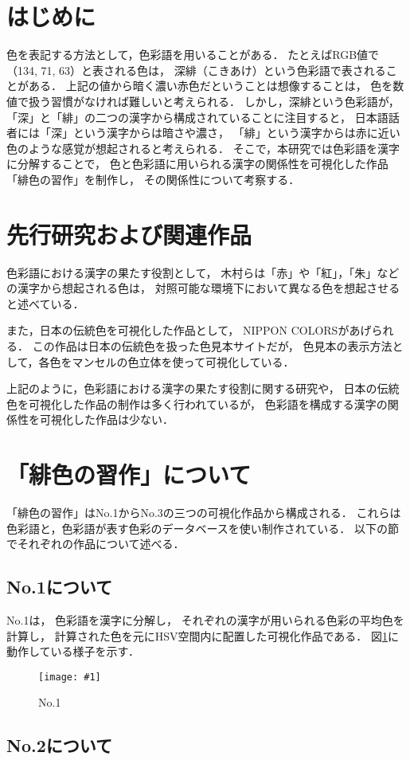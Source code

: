 \documentclass[a4j,twocolumn]{ujarticle} %
\newcommand{\workname}{緋色の習作}
\newcommand{\colorname}{色彩語}
\newcommand{\mysection}[1]{\vspace{-20pt}\section{#1}}
\newcommand{\mysubsection}[1]{\vspace{-18pt}\subsection{#1}}
\newcommand{\myfigure}[3]{
\begin{figure}[htbp]
  \begin{center}
    \texttt{[image: \#1]}
    \caption{#2}
    \vspace{-2zh}
    \label{#3}
  \end{center}
\end{figure}
}
\begin{document}
\maketitle
\thispagestyle{myheadings}

\mysection{はじめに}

色を表記する方法として，\colorname{}を用いることがある．
たとえばRGB値で（134, 71, 63）と表される色は，
深緋（こきあけ）という\colorname{}で表されることがある．
上記の値から暗く濃い赤色だということは想像することは，
色を数値で扱う習慣がなければ難しいと考えられる．
しかし，深緋という\colorname{}が，
「深」と「緋」の二つの漢字から構成されていることに注目すると，
日本語話者には「深」という漢字からは暗さや濃さ，
「緋」という漢字からは赤に近い色のような感覚が想起されると考えられる．
そこで，本研究では\colorname{}を漢字に分解することで，
色と\colorname{}に用いられる漢字の関係性を可視化した作品「\workname{}」を制作し，
その関係性について考察する．

\mysection{先行研究および関連作品}

色彩語における漢字の果たす役割として，
木村ら\cite{Kimura1998}は「赤」や「紅」，「朱」などの漢字から想起される色は，
対照可能な環境下において異なる色を想起させると述べている．

また，日本の伝統色を可視化した作品として，
NIPPON COLORS\cite{NipponColors}があげられる．
この作品は日本の伝統色を扱った色見本サイトだが，
色見本の表示方法として，各色をマンセルの色立体を使って可視化している．

上記のように，色彩語における漢字の果たす役割に関する研究や，
日本の伝統色を可視化した作品の制作は多く行われているが，
色彩語を構成する漢字の関係性を可視化した作品は少ない．

\section{「\workname{}」について}

「\workname{}」はNo.1からNo.3の三つの可視化作品から構成される．
これらは\colorname{}と，色彩語が表す色彩のデータベースを使い制作されている．
以下の節でそれぞれの作品について述べる．

\mysubsection{No.1について}

No.1は，
\colorname{}を漢字に分解し，
それぞれの漢字が用いられる色彩の平均色を計算し，
計算された色を元にHSV空間内に配置した可視化作品である．
図\ref{no1}に動作している様子を示す．

\myfigure{fig/kanji-color-space.eps}{No.1}{no1}

\mysubsection{No.2について}
\end{document}
